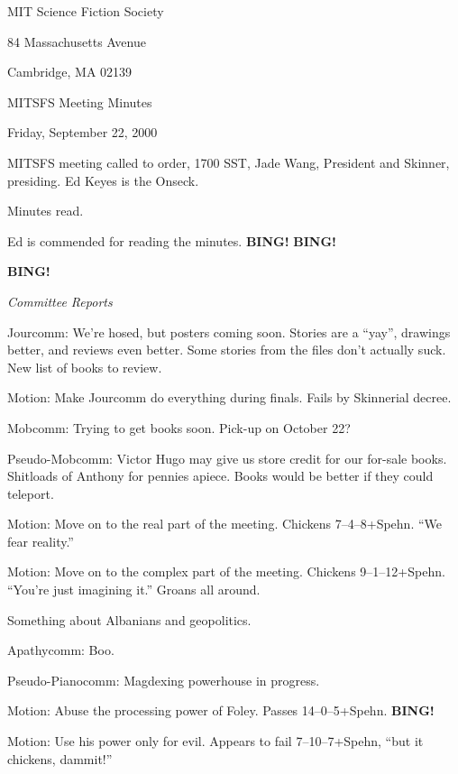 \documentclass[12pt]{article}
\newcommand{\bing}{{\bf BING!} }
\newcommand{\goto}[1]{\bing \vskip 12pt \centerline{{\em{#1}}}}
\begin{document}
\begin{center}

MIT Science Fiction Society 

84 Massachusetts Avenue

Cambridge, MA 02139

\vspace{12pt}

MITSFS Meeting Minutes 

Friday, September 22, 2000

\end{center}
 
\vspace{18pt}

\setlength{\parskip}{6pt}

\noindent
MITSFS meeting called to order, 1700 SST, Jade Wang, President and
Skinner, presiding.  Ed Keyes is the Onseck.

Minutes read.

Ed is commended for reading the minutes.  \bing \bing

\goto{Committee Reports}

Jourcomm: We're hosed, but posters coming soon.  Stories are a ``yay'',
drawings better, and reviews even better.  Some stories from the files
don't actually suck.  New list of books to review.

Motion: Make Jourcomm do everything during finals.  Fails by Skinnerial
decree.

Mobcomm: Trying to get books soon.  Pick-up on October 22?

Pseudo-Mobcomm: Victor Hugo may give us store credit for our for-sale
books.  Shitloads of Anthony for pennies apiece.  Books would be better
if they could teleport.

Motion: Move on to the real part of the meeting.  Chickens 7--4--8+Spehn.
``We fear reality.''

Motion: Move on to the complex part of the meeting.  Chickens
9--1--12+Spehn.  ``You're just imagining it.''  Groans all around.

Something about Albanians and geopolitics.

Apathycomm: Boo.

Pseudo-Pianocomm:  Magdexing powerhouse in progress.

Motion: Abuse the processing power of Foley.  Passes 14--0--5+Spehn.
\bing


Motion: Use his power only for evil.  Appears to fail 7--10--7+Spehn,
``but it chickens, dammit!''
\end{document}
